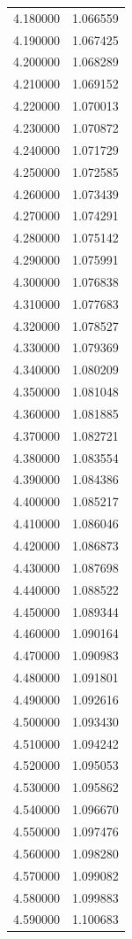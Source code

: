 \begin{tabular}{rr}
4.180000 & 1.066559 \\
4.190000 & 1.067425 \\
4.200000 & 1.068289 \\
4.210000 & 1.069152 \\
4.220000 & 1.070013 \\
4.230000 & 1.070872 \\
4.240000 & 1.071729 \\
4.250000 & 1.072585 \\
4.260000 & 1.073439 \\
4.270000 & 1.074291 \\
4.280000 & 1.075142 \\
4.290000 & 1.075991 \\
4.300000 & 1.076838 \\
4.310000 & 1.077683 \\
4.320000 & 1.078527 \\
4.330000 & 1.079369 \\
4.340000 & 1.080209 \\
4.350000 & 1.081048 \\
4.360000 & 1.081885 \\
4.370000 & 1.082721 \\
4.380000 & 1.083554 \\
4.390000 & 1.084386 \\
4.400000 & 1.085217 \\
4.410000 & 1.086046 \\
4.420000 & 1.086873 \\
4.430000 & 1.087698 \\
4.440000 & 1.088522 \\
4.450000 & 1.089344 \\
4.460000 & 1.090164 \\
4.470000 & 1.090983 \\
4.480000 & 1.091801 \\
4.490000 & 1.092616 \\
4.500000 & 1.093430 \\
4.510000 & 1.094242 \\
4.520000 & 1.095053 \\
4.530000 & 1.095862 \\
4.540000 & 1.096670 \\
4.550000 & 1.097476 \\
4.560000 & 1.098280 \\
4.570000 & 1.099082 \\
4.580000 & 1.099883 \\
4.590000 & 1.100683 \\

\end{tabular}
